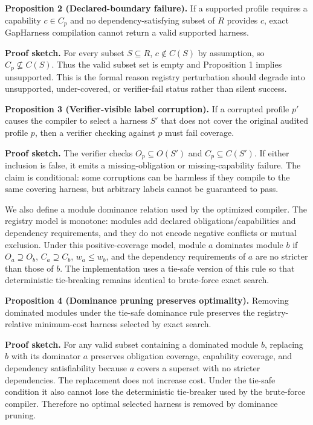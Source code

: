 \documentclass[
  10pt,
]{article}
\begin{document}
\textbf{Proposition 2 (Declared-boundary failure).} If a supported
profile requires a capability \(c\in C_p\) and no dependency-satisfying
subset of \(R\) provides \(c\), exact GapHarness compilation cannot
return a valid supported harness.

\textbf{Proof sketch.} For every subset \(S\subseteq R\),
\(c\notin C(S)\) by assumption, so \(C_p\not\subseteq C(S)\). Thus the
valid subset set is empty and Proposition 1 implies unsupported. This is
the formal reason registry perturbation should degrade into unsupported,
under-covered, or verifier-fail status rather than silent success.

\textbf{Proposition 3 (Verifier-visible label corruption).} If a
corrupted profile \(p'\) causes the compiler to select a harness \(S'\)
that does not cover the original audited profile \(p\), then a verifier
checking against \(p\) must fail coverage.

\textbf{Proof sketch.} The verifier checks \(O_p\subseteq O(S')\) and
\(C_p\subseteq C(S')\). If either inclusion is false, it emits a
missing-obligation or missing-capability failure. The claim is
conditional: some corruptions can be harmless if they compile to the
same covering harness, but arbitrary labels cannot be guaranteed to
pass.

We also define a module dominance relation used by the optimized
compiler. The registry model is monotone: modules add declared
obligations/capabilities and dependency requirements, and they do not
encode negative conflicts or mutual exclusion. Under this
positive-coverage model, module \(a\) dominates module \(b\) if
\(O_a\supseteq O_b\), \(C_a\supseteq C_b\), \(w_a\leq w_b\), and the
dependency requirements of \(a\) are no stricter than those of \(b\).
The implementation uses a tie-safe version of this rule so that
deterministic tie-breaking remains identical to brute-force exact
search.

\textbf{Proposition 4 (Dominance pruning preserves optimality).}
Removing dominated modules under the tie-safe dominance rule preserves
the registry-relative minimum-cost harness selected by exact search.

\textbf{Proof sketch.} For any valid subset containing a dominated
module \(b\), replacing \(b\) with its dominator \(a\) preserves
obligation coverage, capability coverage, and dependency satisfiability
because \(a\) covers a superset with no stricter dependencies. The
replacement does not increase cost. Under the tie-safe condition it also
cannot lose the deterministic tie-breaker used by the brute-force
compiler. Therefore no optimal selected harness is removed by dominance
pruning.
\end{document}
